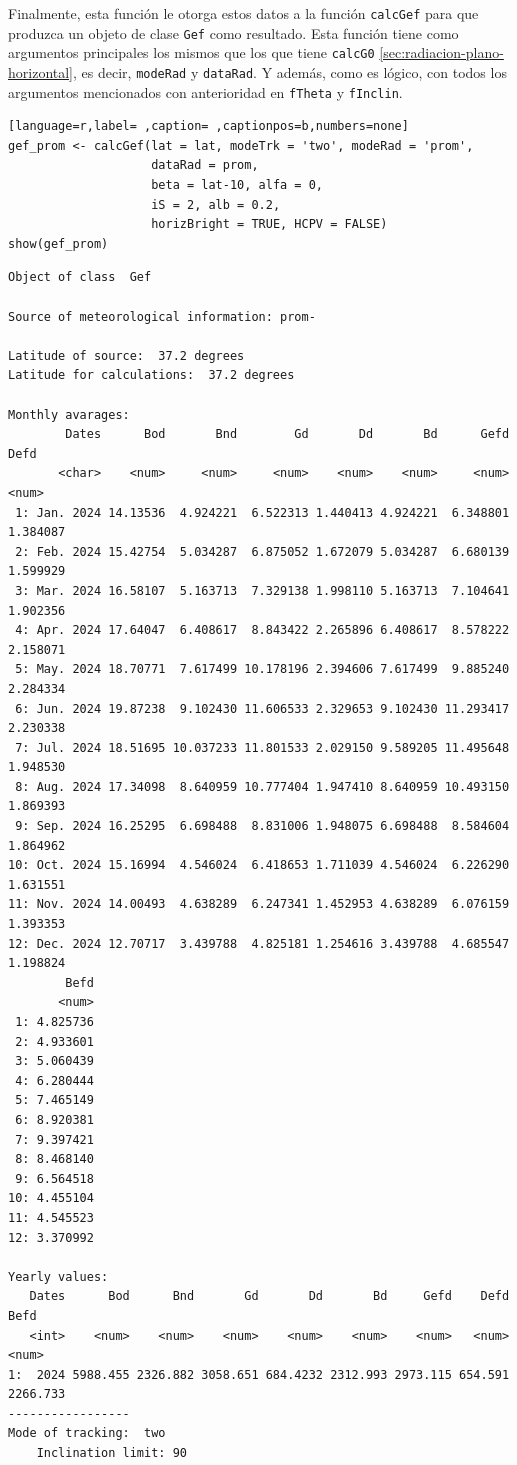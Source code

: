 Finalmente, esta función le otorga estos datos a la función \texttt{calcGef} para que produzca un objeto de clase \texttt{Gef} como resultado. Esta función tiene como argumentos principales los mismos que los que tiene \texttt{calcG0} \ref{sec:radiacion-plano-horizontal}, es decir, \texttt{modeRad} y \texttt{dataRad}. Y además, como es lógico, con todos los argumentos mencionados con anterioridad en \texttt{fTheta} y \texttt{fInclin}.
\begin{lstlisting}[language=r,label= ,caption= ,captionpos=b,numbers=none]
gef_prom <- calcGef(lat = lat, modeTrk = 'two', modeRad = 'prom',
                    dataRad = prom,
                    beta = lat-10, alfa = 0,
                    iS = 2, alb = 0.2,
                    horizBright = TRUE, HCPV = FALSE)
show(gef_prom)
\end{lstlisting}

\begin{verbatim}
Object of class  Gef 

Source of meteorological information: prom- 

Latitude of source:  37.2 degrees
Latitude for calculations:  37.2 degrees

Monthly avarages:
        Dates      Bod       Bnd        Gd       Dd       Bd      Gefd     Defd
       <char>    <num>     <num>     <num>    <num>    <num>     <num>    <num>
 1: Jan. 2024 14.13536  4.924221  6.522313 1.440413 4.924221  6.348801 1.384087
 2: Feb. 2024 15.42754  5.034287  6.875052 1.672079 5.034287  6.680139 1.599929
 3: Mar. 2024 16.58107  5.163713  7.329138 1.998110 5.163713  7.104641 1.902356
 4: Apr. 2024 17.64047  6.408617  8.843422 2.265896 6.408617  8.578222 2.158071
 5: May. 2024 18.70771  7.617499 10.178196 2.394606 7.617499  9.885240 2.284334
 6: Jun. 2024 19.87238  9.102430 11.606533 2.329653 9.102430 11.293417 2.230338
 7: Jul. 2024 18.51695 10.037233 11.801533 2.029150 9.589205 11.495648 1.948530
 8: Aug. 2024 17.34098  8.640959 10.777404 1.947410 8.640959 10.493150 1.869393
 9: Sep. 2024 16.25295  6.698488  8.831006 1.948075 6.698488  8.584604 1.864962
10: Oct. 2024 15.16994  4.546024  6.418653 1.711039 4.546024  6.226290 1.631551
11: Nov. 2024 14.00493  4.638289  6.247341 1.452953 4.638289  6.076159 1.393353
12: Dec. 2024 12.70717  3.439788  4.825181 1.254616 3.439788  4.685547 1.198824
        Befd
       <num>
 1: 4.825736
 2: 4.933601
 3: 5.060439
 4: 6.280444
 5: 7.465149
 6: 8.920381
 7: 9.397421
 8: 8.468140
 9: 6.564518
10: 4.455104
11: 4.545523
12: 3.370992

Yearly values:
   Dates      Bod      Bnd       Gd       Dd       Bd     Gefd    Defd     Befd
   <int>    <num>    <num>    <num>    <num>    <num>    <num>   <num>    <num>
1:  2024 5988.455 2326.882 3058.651 684.4232 2312.993 2973.115 654.591 2266.733
-----------------
Mode of tracking:  two 
    Inclination limit: 90
\end{verbatim}

